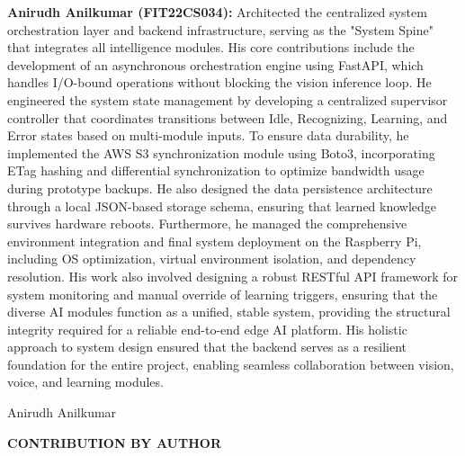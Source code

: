 \documentclass[12pt,a4paper]{report}
\begin{document}
\noindent
\textbf{Anirudh Anilkumar (FIT22CS034):} Architected the centralized system orchestration layer and backend infrastructure, serving as the "System Spine" that integrates all intelligence modules. His core contributions include the development of an asynchronous orchestration engine using FastAPI, which handles I/O-bound operations without blocking the vision inference loop. He engineered the system state management by developing a centralized supervisor controller that coordinates transitions between Idle, Recognizing, Learning, and Error states based on multi-module inputs. To ensure data durability, he implemented the AWS S3 synchronization module using Boto3, incorporating ETag hashing and differential synchronization to optimize bandwidth usage during prototype backups. He also designed the data persistence architecture through a local JSON-based storage schema, ensuring that learned knowledge survives hardware reboots. Furthermore, he managed the comprehensive environment integration and final system deployment on the Raspberry Pi, including OS optimization, virtual environment isolation, and dependency resolution. His work also involved designing a robust RESTful API framework for system monitoring and manual override of learning triggers, ensuring that the diverse AI modules function as a unified, stable system, providing the structural integrity required for a reliable end-to-end edge AI platform. His holistic approach to system design ensured that the backend serves as a resilient foundation for the entire project, enabling seamless collaboration between vision, voice, and learning modules.

\vspace{3cm}
\begin{flushright}
    Anirudh Anilkumar
\end{flushright}

\newpage
\begin{center}
    \textbf{\large CONTRIBUTION BY AUTHOR}
\end{center}
\vspace{0.5cm}
\end{document}
